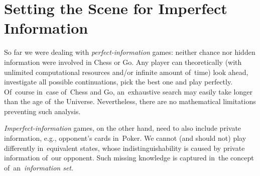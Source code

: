 \chapter{Setting the Scene for Imperfect Information}
\label{ch:imperf-intro}
So far we were dealing with \emph{perfect-information} games:
neither chance nor hidden information were involved in Chess or Go.
Any player can theoretically (with unlimited computational resources and/or infinite amount of~time) look ahead, investigate all possible continuations, pick the best one and play perfectly.
Of~course in~case of~Chess and Go, an~exhaustive search may easily take longer than the age of~the Universe.
Nevertheless, there are no mathematical limitations preventing such analysis.

\emph{Imperfect-information} games, on the other hand, need to also include private information, e.g., opponent's cards in~Poker.
We cannot (and should not) play differently in~equivalent states, whose indistinguishability is caused by private information of~our opponent.
Such missing knowledge is captured in~the concept of~an~\emph{information set}.

